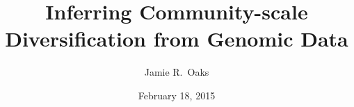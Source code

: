 

\newcommand{\allParameters}[1]{\ensuremath{\theta_{#1}}\xspace}



\title[Inferring community history]{Inferring Community-scale Diversification
    from Genomic Data}

\author[J.\ Oaks]{
    Jamie R.\ Oaks
}

\date{February 18, 2015}



\begin{frame}[noframenumbering]
    \titlepage
\end{frame}


